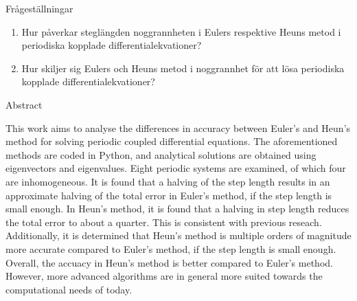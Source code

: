 \documentclass[12pt, aspectratio=169, xcolor={dvipsnames,svgnames}]{beamer}
\begin{document}
\begin{frame}{Frågeställningar}
    \begin{enumerate}
        \item Hur påverkar steglängden noggrannheten i Eulers respektive Heuns metod i periodiska kopplade differentialekvationer?
        \item Hur skiljer sig Eulers och Heuns metod i noggrannhet för att lösa periodiska kopplade differentialekvationer?
    \end{enumerate}
\end{frame}

\begin{frame}{Abstract}
    \begin{footnotesize}
    This work aims to analyse the differences in accuracy between Euler's and Heun's method for solving periodic coupled differential equations. The aforementioned methods are coded in Python, and analytical solutions are obtained using eigenvectors and eigenvalues. Eight periodic systems are examined, of which four are inhomogeneous. It is found that a halving of the step length results in an approximate halving of the total error in Euler's method, if the step length is small enough. In Heun's method, it is found that a halving in step length reduces the total error to about a quarter. This is consistent with previous reseach. Additionally, it is determined that Heun's method is multiple orders of magnitude more accurate compared to Euler's method, if the step length is small enough. Overall, the accuacy in Heun's method is better compared to Euler's method. However, more advanced algorithms are in general more suited towards the computational needs of today.
    \end{footnotesize}
\end{frame}

%            
%            
\end{document}
